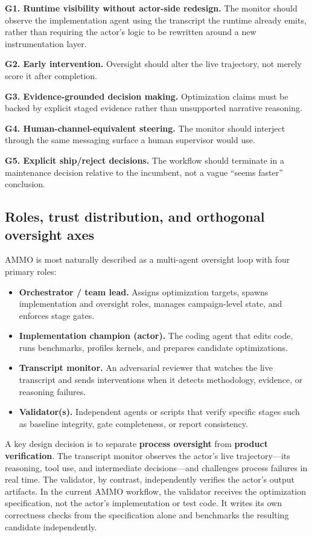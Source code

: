 \documentclass[11pt]{article}
\begin{document}
\textbf{G1. Runtime visibility without actor-side redesign.} The monitor should observe the implementation agent using the transcript the runtime already emits, rather than requiring the actor's logic to be rewritten around a new instrumentation layer.

\textbf{G2. Early intervention.} Oversight should alter the live trajectory, not merely score it after completion.

\textbf{G3. Evidence-grounded decision making.} Optimization claims must be backed by explicit staged evidence rather than unsupported narrative reasoning.

\textbf{G4. Human-channel-equivalent steering.} The monitor should interject through the same messaging surface a human supervisor would use.

\textbf{G5. Explicit ship/reject decisions.} The workflow should terminate in a maintenance decision relative to the incumbent, not a vague ``seems faster'' conclusion.

\subsection{Roles, trust distribution, and orthogonal oversight axes}
\label{sec:roles}

AMMO is most naturally described as a multi-agent oversight loop with four primary roles:

\begin{itemize}[leftmargin=*,itemsep=2pt]
  \item \textbf{Orchestrator / team lead.} Assigns optimization targets, spawns implementation and oversight roles, manages campaign-level state, and enforces stage gates.
  \item \textbf{Implementation champion (actor).} The coding agent that edits code, runs benchmarks, profiles kernels, and prepares candidate optimizations.
  \item \textbf{Transcript monitor.} An adversarial reviewer that watches the live transcript and sends interventions when it detects methodology, evidence, or reasoning failures.
  \item \textbf{Validator(s).} Independent agents or scripts that verify specific stages such as baseline integrity, gate completeness, or report consistency.
\end{itemize}

A key design decision is to separate \textbf{process oversight} from \textbf{product verification}. The transcript monitor observes the actor's live trajectory---its reasoning, tool use, and intermediate decisions---and challenges process failures in real time. The validator, by contrast, independently verifies the actor's output artifacts. In the current AMMO workflow, the validator receives the optimization specification, not the actor's implementation or test code. It writes its own correctness checks from the specification alone and benchmarks the resulting candidate independently.
\end{document}
